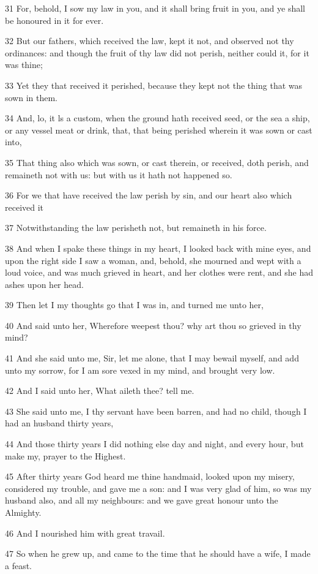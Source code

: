 \par 31 For, behold, I sow my law in you, and it shall bring fruit in you, and ye shall be honoured in it for ever.
\par 32 But our fathers, which received the law, kept it not, and observed not thy ordinances: and though the fruit of thy law did not perish, neither could it, for it was thine;
\par 33 Yet they that received it perished, because they kept not the thing that was sown in them.
\par 34 And, lo, it ls a custom, when the ground hath received seed, or the sea a ship, or any vessel meat or drink, that, that being perished wherein it was sown or cast into,
\par 35 That thing also which was sown, or cast therein, or received, doth perish, and remaineth not with us: but with us it hath not happened so.
\par 36 For we that have received the law perish by sin, and our heart also which received it
\par 37 Notwithstanding the law perisheth not, but remaineth in his force.
\par 38 And when I spake these things in my heart, I looked back with mine eyes, and upon the right side I saw a woman, and, behold, she mourned and wept with a loud voice, and was much grieved in heart, and her clothes were rent, and she had ashes upon her head.
\par 39 Then let I my thoughts go that I was in, and turned me unto her,
\par 40 And said unto her, Wherefore weepest thou? why art thou so grieved in thy mind?
\par 41 And she said unto me, Sir, let me alone, that I may bewail myself, and add unto my sorrow, for I am sore vexed in my mind, and brought very low.
\par 42 And I said unto her, What aileth thee? tell me.
\par 43 She said unto me, I thy servant have been barren, and had no child, though I had an husband thirty years,
\par 44 And those thirty years I did nothing else day and night, and every hour, but make my, prayer to the Highest.
\par 45 After thirty years God heard me thine handmaid, looked upon my misery, considered my trouble, and gave me a son: and I was very glad of him, so was my husband also, and all my neighbours: and we gave great honour unto the Almighty.
\par 46 And I nourished him with great travail.
\par 47 So when he grew up, and came to the time that he should have a wife, I made a feast.

